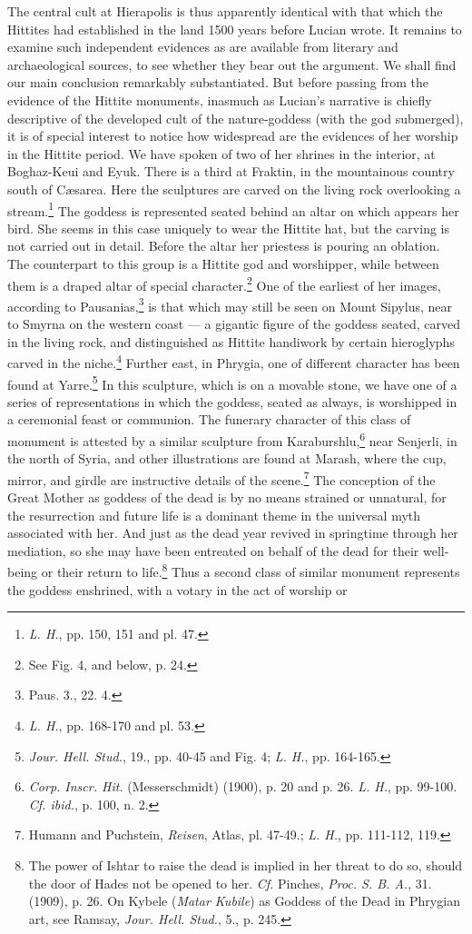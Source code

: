 \documentclass[a4paper, 11pt, oneside, polutonikogreek, english]{article}
\begin{document}
The central cult at Hierapolis is thus apparently identical with that which the Hittites had established in the land 1500 years before Lucian wrote. It remains to examine such independent evidences as are available from literary and archaeological sources, to see whether they bear out the argument. We shall find our main conclusion remarkably substantiated. But before passing from the evidence of the Hittite monuments, inasmuch as Lucian's narrative is chiefly descriptive of the developed cult of the nature-goddess (with the god submerged), it is of special interest to notice how widespread are the evidences of her worship in the Hittite period. We have spoken of two of her shrines in the interior, at Boghaz-Keui and Eyuk. There is a third at Fraktin, in the mountainous country south of Cæsarea. Here the sculptures are carved on the living rock overlooking a stream.\footnote{\emph{L. H.}, pp. 150, 151 and pl. 47.} The goddess is represented seated behind an altar on which appears her bird. She seems in this case uniquely to wear the Hittite hat, but the carving is not carried out in detail. Before the altar her priestess is pouring an oblation. The counterpart to this group is a Hittite god and worshipper, while between them is a draped altar of special character.\footnote{See Fig. 4, and below, p. 24.} One of the earliest of her images, according to Pausanias,\footnote{Paus. 3., 22. 4.} is that which may still be seen on Mount Sipylus, near to Smyrna on the western coast --- a gigantic figure of the goddess seated, carved in the living rock, and distinguished as Hittite handiwork by certain hieroglyphs carved in the niche.\footnote{\emph{L. H.}, pp. 168-170 and pl. 53.} Further east, in Phrygia, one of different character has been found at Yarre.\footnote{\emph{Jour. Hell. Stud.}, 19., pp. 40-45 and Fig. 4; \emph{L. H.}, pp. 164-165.} In this sculpture, which is on a movable stone, we have one of a series of representations in which the goddess, seated as always, is worshipped in a ceremonial feast or communion. The funerary character of this class of monument is attested by a similar sculpture from Karaburshlu,\footnote{\emph{Corp. Inscr. Hit.} (Messerschmidt) (1900), p. 20 and p. 26. \emph{L. H.}, pp. 99-100. \emph{Cf. ibid.}, p. 100, n. 2.} near Senjerli, in the north of Syria, and other illustrations are found at Marash, where the cup, mirror, and girdle are instructive details of the scene.\footnote{Humann and Puchstein, \emph{Reisen}, Atlas, pl. 47-49.; \emph{L. H.}, pp. 111-112, 119.} The conception of the Great Mother as goddess of the dead is by no means strained or unnatural, for the resurrection and future life is a dominant theme in the universal myth associated with her. And just as the dead year revived in springtime through her mediation, so she may have been entreated on behalf of the dead for their well-being or their return to life.\footnote{The power of Ishtar to raise the dead is implied in her threat to do so, should the door of Hades not be opened to her. \emph{Cf.} Pinches, \emph{Proc. S. B. A.}, 31. (1909), p. 26. On Kybele (\emph{Matar Kubile}) as Goddess of the Dead in Phrygian art, see Ramsay, \emph{Jour. Hell. Stud.}, 5., p. 245.} Thus a second class of similar monument represents the goddess enshrined, with a votary in the act of worship or 
\end{document}
